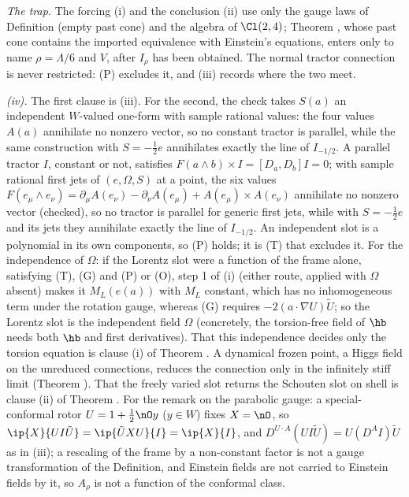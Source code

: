 \emph{The trap.} The forcing (i) and the conclusion (ii) use only the gauge laws of Definition  (empty past cone) and the algebra of $\Cl(2,4)$; Theorem , whose past cone contains the imported equivalence with Einstein's equations, enters only to name $\rho = \Lambda/6$ and $V$, after $I_{\rho}$ has been obtained. The normal tractor connection is never restricted: (P) excludes it, and (iii) records where the two meet.

\emph{(iv).} The first clause is (iii). For the second, the check takes $S(a)$ an independent $W$-valued one-form with sample rational values: the four values $A(a)$ annihilate no nonzero vector, so no constant tractor is parallel, while the same construction with $S = -\tfrac12 e$ annihilates exactly the line of $I_{-1/2}$. A parallel tractor $I$, constant or not, satisfies $F(a \wedge b) \times I = [D_{a}, D_{b}]I = 0$; with sample rational first jets of $(e, \Omega, S)$ at a point, the six values $F(e_{\mu} \wedge e_{\nu}) = \partial_{\mu}A(e_{\nu}) - \partial_{\nu}A(e_{\mu}) + A(e_{\mu}) \times A(e_{\nu})$ annihilate no nonzero vector (checked), so no tractor is parallel for generic first jets, while with $S = -\tfrac12 e$ and its jets they annihilate exactly the line of $I_{-1/2}$. An independent slot is a polynomial in its own components, so (P) holds; it is (T) that excludes it. For the independence of $\Omega$: if the Lorentz slot were a function of the frame alone, satisfying (T), (G) and (P) or (O), step 1 of (i) (either route, applied with $\Omega$ absent) makes it $M_{L}(e(a))$ with $M_{L}$ constant, which has no inhomogeneous term under the rotation gauge, whereas (G) requires $-2(a \cdot \nabla U)\tilde U$; so the Lorentz slot is the independent field $\Omega$ (concretely, the torsion-free field of $\hb$ needs both $\hb$ and first derivatives). That this independence decides only the torsion equation is clause (i) of Theorem . A dynamical frozen point, a Higgs field on the unreduced connections, reduces the connection only in the infinitely stiff limit (Theorem ). That the freely varied slot returns the Schouten slot on shell is clause (ii) of Theorem . For the remark on the parabolic gauge: a special-conformal rotor $U = 1 + \tfrac12\nO y$ ($y \in W$) fixes $X = \nO$, so $\ip{X}{U I \tilde U} = \ip{\tilde U X U}{I} = \ip{X}{I}$, and $D^{U \cdot A}(U I \tilde U) = U (D^{A} I)\tilde U$ as in (iii); a rescaling of the frame by a non-constant factor is not a gauge transformation of the Definition, and Einstein fields are not carried to Einstein fields by it, so $A_{\rho}$ is not a function of the conformal class.

